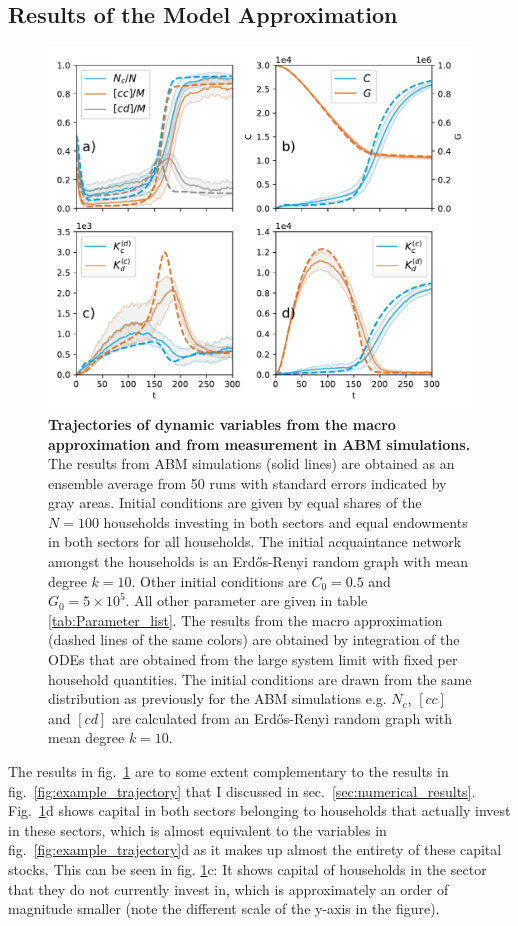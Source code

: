 \subsection{Results of the Model Approximation}

\begin{figure}[ht!]
\centering\includegraphics[width=.9\linewidth]{figures/micro_vs_approx_v2.pdf}
\caption{\textbf{Trajectories of dynamic variables from the macro approximation and from measurement in ABM simulations.} The results from ABM simulations (solid lines) are obtained as an ensemble average from 50 runs with standard errors indicated by gray areas. Initial conditions are given by equal shares of the $N=100$ households investing in both sectors and equal endowments in both sectors for all households. The initial acquaintance network amongst the households is an Erd\H{o}s-Renyi random graph with mean degree $k=10$. Other initial conditions are $C_0=0.5$ and $G_0=5 \times 10^5$. All other parameter are given in table \ref{tab:Parameter_list}. The results from the macro approximation (dashed lines of the same colors) are obtained by integration of the ODEs that are obtained from the large system limit with fixed per household quantities. The initial conditions are drawn from the same distribution as previously for the ABM simulations e.g. $N_c$, $[cc]$ and $[cd]$ are calculated from an Erd\H{o}s-Renyi random graph with mean degree $k=10$.}
\label{fig:comparison2}
\end{figure}
The results in  fig.~\ref{fig:comparison2} are to some extent complementary to the results in fig.~\ref{fig:example_trajectory} that I discussed in sec.~\ref{sec:numerical_results}. Fig.~\ref{fig:comparison2}d shows capital in both sectors belonging to households that actually invest in these sectors, which is almost equivalent to the variables in fig.~\ref{fig:example_trajectory}d as it makes up almost the entirety of these capital stocks. This can be seen in fig. \ref{fig:comparison2}c: It shows capital of households in the sector that they do not currently invest in, which is approximately an order of magnitude smaller (note the different scale of the y-axis in the figure).

